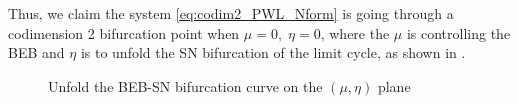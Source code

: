 Thus, we claim the system \cref{eq:codim2_PWL_Nform} is going through a codimension 2 bifurcation point when $\mu =
0, \; \eta = 0$, where the $\mu$ is controlling the BEB and $\eta$ is to unfold the SN bifurcation of the
limit cycle, as shown in .
%
\begin{figure}[ht!]
	\centering
	\caption{Unfold the BEB-SN bifurcation curve on the $(\mu, \eta)$ plane }
	\label{fig:codim2_SN_curve}
\end{figure}
%


